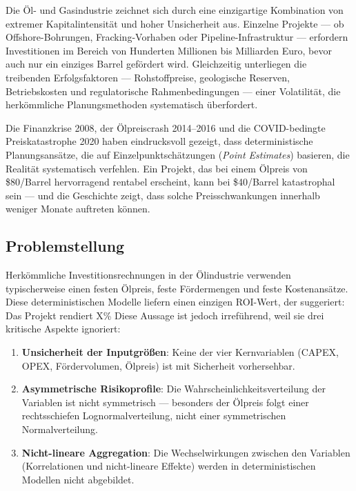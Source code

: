 \documentclass[12pt,a4paper]{article}
\begin{document}
Die Öl- und Gasindustrie zeichnet sich durch eine einzigartige Kombination von extremer Kapitalintensität und hoher Unsicherheit aus. Einzelne Projekte — ob Offshore-Bohrungen, Fracking-Vorhaben oder Pipeline-Infrastruktur — erfordern Investitionen im Bereich von Hunderten Millionen bis Milliarden Euro, bevor auch nur ein einziges Barrel gefördert wird. Gleichzeitig unterliegen die treibenden Erfolgsfaktoren — Rohstoffpreise, geologische Reserven, Betriebskosten und regulatorische Rahmenbedingungen — einer Volatilität, die herkömmliche Planungsmethoden systematisch überfordert.

Die Finanzkrise 2008, der Ölpreiscrash 2014–2016 und die COVID-bedingte Preiskatastrophe 2020 haben eindrucksvoll gezeigt, dass deterministische Planungsansätze, die auf Einzelpunktschätzungen (\textit{Point Estimates}) basieren, die Realität systematisch verfehlen. Ein Projekt, das bei einem Ölpreis von \$80/Barrel hervorragend rentabel erscheint, kann bei \$40/Barrel katastrophal sein — und die Geschichte zeigt, dass solche Preisschwankungen innerhalb weniger Monate auftreten können.

\subsection{Problemstellung}

Herkömmliche Investitionsrechnungen in der Ölindustrie verwenden typischerweise einen festen Ölpreis, feste Fördermengen und feste Kostenansätze. Diese deterministischen Modelle liefern einen einzigen ROI-Wert, der suggeriert: \glqq Das Projekt rendiert X\%\grqq{} Diese Aussage ist jedoch irreführend, weil sie drei kritische Aspekte ignoriert:

\begin{enumerate}[label=\arabic*., itemsep=4pt]
  \item \textbf{Unsicherheit der Inputgrößen}: Keine der vier Kernvariablen (CAPEX, OPEX, Fördervolumen, Ölpreis) ist mit Sicherheit vorhersehbar.
  \item \textbf{Asymmetrische Risikoprofile}: Die Wahrscheinlichkeitsverteilung der Variablen ist nicht symmetrisch — besonders der Ölpreis folgt einer rechtsschiefen Lognormalverteilung, nicht einer symmetrischen Normalverteilung.
  \item \textbf{Nicht-lineare Aggregation}: Die Wechselwirkungen zwischen den Variablen (Korrelationen und nicht-lineare Effekte) werden in deterministischen Modellen nicht abgebildet.
\end{enumerate}
\end{document}
